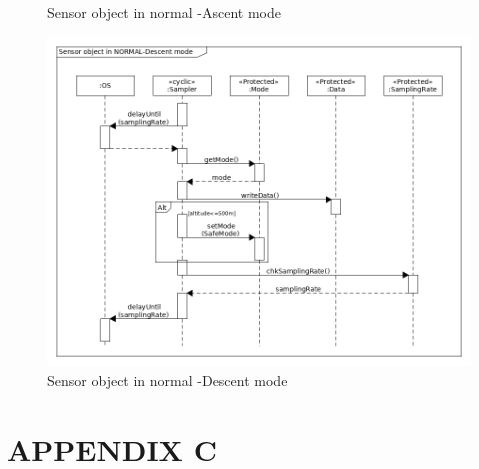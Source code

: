 \documentclass[a4paper,12pt,twoside]{article}
\providecommand{\DIFaddbegin}{} %
\providecommand{\DIFaddend}{} %
\providecommand{\DIFaddbeginFL}{} %
\providecommand{\DIFaddendFL}{} %
\providecommand{\DIFdelbeginFL}{} %
\providecommand{\DIFdelendFL}{} %
\newcommand{\DIFscaledelfig}{0.5}
\newlength{\DIFdelgraphicswidth} %
\newlength{\DIFdelgraphicsheight} %
\newcommand{\DIFaddincludegraphics}[2][]{{\color{blue}\fbox{\DIFOincludegraphics[#1]{#2}}}} %
\newcommand{\DIFdelincludegraphics}[2][]{%
\sbox{\DIFdelgraphicsbox}{\DIFOincludegraphics[#1]{#2}}%
\settoboxwidth{\DIFdelgraphicswidth}{\DIFdelgraphicsbox} %
\settoboxtotalheight{\DIFdelgraphicsheight}{\DIFdelgraphicsbox} %
\scalebox{\DIFscaledelfig}{%
\parbox[b]{\DIFdelgraphicswidth}{\usebox{\DIFdelgraphicsbox}\\[-\baselineskip] \rule{\DIFdelgraphicswidth}{0em}}\llap{\resizebox{\DIFdelgraphicswidth}{\DIFdelgraphicsheight}{%
\setlength{\unitlength}{\DIFdelgraphicswidth}%
\begin{picture}(1,1)%
\thicklines\linethickness{2pt} %
{\color[rgb]{1,0,0}\put(0,0){\framebox(1,1){}}}%
{\color[rgb]{1,0,0}\put(0,0){\line( 1,1){1}}}%
{\color[rgb]{1,0,0}\put(0,1){\line(1,-1){1}}}%
\end{picture}%
}\hspace*{3pt}}} %
} %
\DeclareRobustCommand{\DIFaddbegin}{\DIFOaddbegin \let\includegraphics\DIFaddincludegraphics} %
\DeclareRobustCommand{\DIFaddend}{\DIFOaddend \let\includegraphics\DIFOincludegraphics} %
\DeclareRobustCommand{\DIFaddbeginFL}{\DIFOaddbeginFL \let\includegraphics\DIFaddincludegraphics} %
\DeclareRobustCommand{\DIFaddendFL}{\DIFOaddendFL \let\includegraphics\DIFOincludegraphics} %
\DeclareRobustCommand{\DIFdelbeginFL}{\DIFOdelbeginFL \let\includegraphics\DIFdelincludegraphics} %
\DeclareRobustCommand{\DIFdelendFL}{\DIFOaddendFL \let\includegraphics\DIFOincludegraphics} %
\begin{document}
\begin{landscape}
\begin{figure}[H]
    \DIFaddendFL \caption{Sensor object in normal -Ascent mode}
    \label{sensorb}
\end{figure}
\begin{figure}[H]
    \centering
    \DIFdelbeginFL %
\DIFdelendFL \DIFaddbeginFL \includegraphics[height=0.9\textwidth]{appendix/img/sensor-dia-seq-c.png}
    \DIFaddendFL \caption{Sensor object in normal -Descent mode}
    \label{sensorc}
\end{figure}
\DIFaddbegin \end{landscape}
\DIFaddend \section{APPENDIX C} \label{sec:appC}
\end{document}

